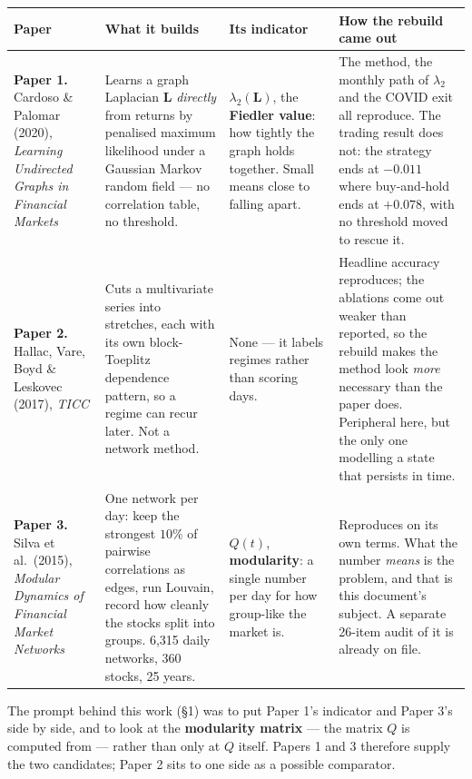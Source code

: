 \documentclass[11pt,a4paper]{article}
\newcommand{\Q}{Q}
\newcommand{\Lap}{\mathbf{L}}
\begin{document}
\begin{center}\small
\renewcommand{\arraystretch}{1.22}\setlength{\tabcolsep}{4.5pt}
\begin{tabular}{@{}>{\raggedright\arraybackslash}p{3.55cm}
                  >{\raggedright\arraybackslash}p{4.95cm}
                  >{\raggedright\arraybackslash}p{2.4cm}
                  >{\raggedright\arraybackslash}p{4.4cm}@{}}
\toprule
\textbf{Paper} & \textbf{What it builds} & \textbf{Its indicator} &
\textbf{How the rebuild came out} \\
\midrule
\textbf{Paper 1.} Cardoso \& Palomar (2020), \emph{Learning Undirected Graphs
in Financial Markets} &
Learns a graph Laplacian $\Lap$ \emph{directly} from returns by penalised
maximum likelihood under a Gaussian Markov random field --- no correlation
table, no threshold. &
$\lambda_2(\Lap)$, the \textbf{Fiedler value}: how tightly the graph holds
together. Small means close to falling apart. &
The method, the monthly path of $\lambda_2$ and the COVID exit all reproduce.
The trading result does not: the strategy ends at $-0.011$ where buy-and-hold
ends at $+0.078$, with no threshold moved to rescue it. \\
\addlinespace[2pt]
\textbf{Paper 2.} Hallac, Vare, Boyd \& Leskovec (2017), \emph{TICC} &
Cuts a multivariate series into stretches, each with its own block-Toeplitz
dependence pattern, so a regime can recur later. Not a network method. &
None --- it labels regimes rather than scoring days. &
Headline accuracy reproduces; the ablations come out weaker than reported, so
the rebuild makes the method look \emph{more} necessary than the paper does.
Peripheral here, but the only one modelling a state that persists in time. \\
\addlinespace[2pt]
\textbf{Paper 3.} Silva et al.\ (2015), \emph{Modular Dynamics of Financial
Market Networks} &
One network per day: keep the strongest $10\%$ of pairwise correlations as
edges, run Louvain, record how cleanly the stocks split into groups.
6{,}315 daily networks, 360 stocks, 25 years. &
$\Q(t)$, \textbf{modularity}: a single number per day for how group-like the
market is. &
Reproduces on its own terms. What the number \emph{means} is the problem, and
that is this document's subject. A separate 26-item audit of it is already on
file. \\
\bottomrule
\end{tabular}
\end{center}

\noindent The prompt behind this work (\S1) was to put Paper 1's indicator and
Paper 3's side by side, and to look at the \textbf{modularity matrix} --- the
matrix $\Q$ is computed from --- rather than only at $\Q$ itself. Papers 1 and 3 therefore
supply the two candidates; Paper 2 sits to one side as a possible comparator.
\end{document}
